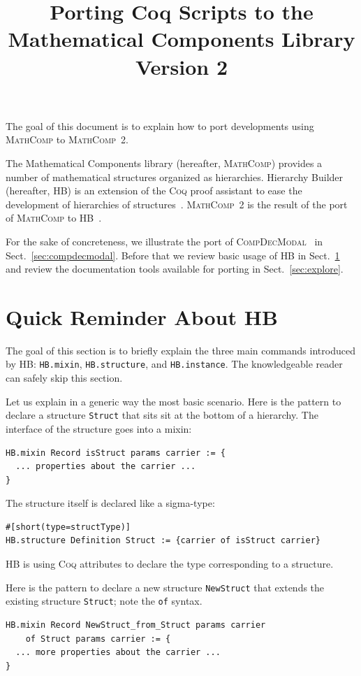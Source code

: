\documentclass{article}
\title{Porting Coq Scripts to the Mathematical Components Library Version 2}
\def\coq{\textsc{Coq}}
\def\mathcomp{\textsc{MathComp}}
\def\hb{\textsc{HB}}
\def\compdecmodal{\textsc{CompDecModal}}
\def\coqin#1{\texttt{#1}}
\begin{document}
\maketitle

The goal of this document is to explain how to port developments using \mathcomp{}
to \mathcomp{}~2.

The Mathematical Components library (hereafter, \mathcomp) provides a number
of mathematical structures organized as hierarchies. Hierarchy Builder (hereafter, \hb)
is an extension of the \coq{} proof assistant to ease the development of
hierarchies of structures~\cite{cohen2020fscd}. \mathcomp{}~2 is the result
of the port of \mathcomp{} to \hb{}~\cite{mathcomp2021coq}.

For the sake of concreteness, we illustrate the port of
\compdecmodal~\cite{compdecmodal} in Sect.~\ref{sec:compdecmodal}.
Before that we review basic usage of \hb{} in Sect.~\ref{sec:reminder}
and review the documentation tools available for porting in Sect.~\ref{sec:explore}.

\tableofcontents

\section{Quick Reminder About \hb}
\label{sec:reminder}

The goal of this section is to briefly explain the three main commands
introduced by \hb: \coqin{HB.mixin}, \coqin{HB.structure}, and
\coqin{HB.instance}. The knowledgeable reader can safely skip this
section.

Let us explain in a generic way the most basic scenario.
Here is the pattern to declare a structure \coqin{Struct} that sits
sit at the bottom of a hierarchy.  The interface of the structure goes
into a mixin:
\begin{verbatim}
HB.mixin Record isStruct params carrier := {
  ... properties about the carrier ...
}
\end{verbatim}

The structure itself is declared like a sigma-type:
\begin{verbatim}
#[short(type=structType)]
HB.structure Definition Struct := {carrier of isStruct carrier}
\end{verbatim}
\hb{} is using \coq{} attributes to declare the type corresponding to a structure.

Here is the pattern to declare a new structure \coqin{NewStruct} that
extends the existing structure \coqin{Struct}; note the \coqin{of} syntax.
\begin{verbatim}
HB.mixin Record NewStruct_from_Struct params carrier
    of Struct params carrier := {
  ... more properties about the carrier ...
}
\end{verbatim}
\end{document}
